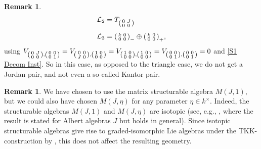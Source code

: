 \documentclass[oneside,a4paper]{amsart} %
\theoremstyle{definition}
\newtheorem{remark}[theorem]{Remark}
\newcommand{\LL}{\mathcal{L}}
\numberwithin{equation}{section}
\begin{document}
\begin{remark}
\begin{align*}
		\LL_{2}&= T_{\begin{psmallmatrix}
			0 & J \\ 0 & 0
		\end{psmallmatrix} }\\[1ex]
		\LL_{3}&= \begin{psmallmatrix} k & 0 \\ 0 & 0 \end{psmallmatrix}_-\oplus \begin{psmallmatrix} k & 0 \\ 0 & 0 \end{psmallmatrix}_+, 	
	\end{align*}
	using $V_{\begin{psmallmatrix}
			0 & J \\ 0 & 0
		\end{psmallmatrix},\begin{psmallmatrix}
			0 & 0 \\ 0 & 1
		\end{psmallmatrix}}=V_{\begin{psmallmatrix}
			0 & 0 \\ J & 0
		\end{psmallmatrix},\begin{psmallmatrix}
			1 & 0 \\ 0 & 0
		\end{psmallmatrix}}=V_{\begin{psmallmatrix}
			1 & 0 \\ 0 & 0
		\end{psmallmatrix},\begin{psmallmatrix}
			1 & 0 \\ 0 & 0
		\end{psmallmatrix}}=V_{\begin{psmallmatrix}
			0 & 0 \\ 0 & 1
		\end{psmallmatrix},\begin{psmallmatrix}
			0 & 0 \\ 0 & 1
		\end{psmallmatrix}}=0$ and \cref{S1 Decom Inst}.
		So in this case, as opposed to the triangle case, we do not get a Jordan pair, and not even a so-called Kantor pair.
\end{remark}


\begin{remark}
    We have chosen to use the matrix structurable algebra $M(J,1)$, but we could also have chosen $M(J,\eta)$ for any parameter $\eta \in k^\times$.
    Indeed, the structurable algebras $M(J,1)$ and $M(J,\eta)$ are isotopic (see, e.g., \cite[Proposition~4.11 and Lemma~4.13]{Garibaldi2001}, where the result is stated for Albert algebras $J$ but holds in general).
    Since isotopic structurable algebras give rise to graded-isomorphic Lie algebras under the TKK-construction by \cite[Proposition~12.3]{Allison1981}, this does not affect the resulting geometry.
\end{remark}
\end{document}
